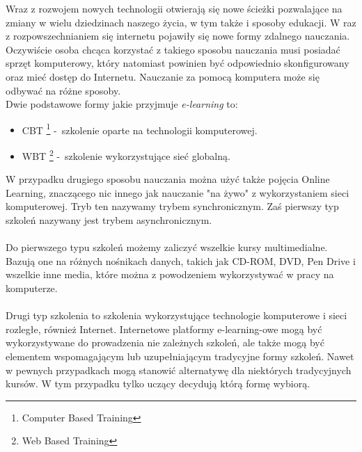 \hspace{1cm} Wraz z rozwojem nowych technologii otwierają się nowe ścieżki pozwalające na zmiany w wielu dziedzinach naszego życia, w tym także i sposoby edukacji. W raz z rozpowszechnianiem się internetu pojawiły się nowe formy zdalnego nauczania. Oczywiście osoba chcąca korzystać z takiego sposobu nauczania musi posiadać sprzęt komputerowy, który natomiast powinien być odpowiednio skonfigurowany oraz mieć dostęp do Internetu. Nauczanie za pomocą komputera może się odbywać na różne sposoby. \\
Dwie podstawowe formy jakie przyjmuje \textit{e-learning} to:
\begin{itemize}
	\item CBT \footnote{Computer Based Training} -~szkolenie oparte na technologii komputerowej.
	\item WBT \footnote{Web Based Training} -~szkolenie wykorzystujące sieć globalną.
\end{itemize}

W przypadku drugiego sposobu nauczania można użyć także pojęcia Online Learning, znaczącego nic innego jak nauczanie "na żywo" z wykorzystaniem sieci komputerowej. Tryb ten nazywamy trybem synchronicznym. Zaś pierwszy typ szkoleń nazywany jest trybem asynchronicznym. \\
\ \\
Do pierwszego typu szkoleń możemy zaliczyć wszelkie kursy multimedialne. Bazują one na różnych nośnikach danych, takich jak CD-ROM, DVD, Pen Drive i wszelkie inne media, które można z powodzeniem wykorzystywać w pracy na komputerze. \\
\ \\
Drugi typ szkolenia to szkolenia wykorzystujące technologie komputerowe i sieci rozległe, również Internet. Internetowe platformy e-learning-owe mogą być wykorzystywane do prowadzenia nie zależnych szkoleń, ale także mogą być elementem wspomagającym lub uzupełniającym tradycyjne formy szkoleń. Nawet w pewnych przypadkach mogą stanowić alternatywę dla niektórych tradycyjnych kursów. W tym przypadku tylko uczący decydują którą formę wybiorą. \\






